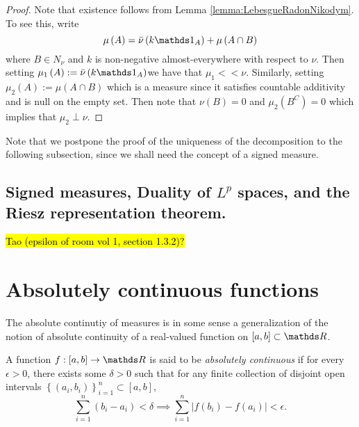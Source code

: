 \begin{proof}
Note that existence follows from Lemma \ref{lemma:LebesgueRadonNikodym}.
To see this, write 
\[
\mu\left(A\right)=\lebInt{\nu}{k\indicate_{A}}+\mu\left(A\cap B\right)
\]
where $B\in N_{\nu}$ and $k$ is non-negative almost-everywhere with
respect to $\nu.$ Then setting $\text{\ensuremath{\mu_{1}\left(A\right):=\lebInt{\nu}{k\indicate_{A}}}}$we
have that $\mu_{1}<<\nu$. Similarly, setting $\mu_{2}\left(A\right):=\mu\left(A\cap B\right)$
which is a measure since it satisfies countable additivity and is
null on the empty set. Then note that $\nu\left(B\right)=0$ and $\mu_{2}\left(B^{C}\right)=0$
which implies that $\mu_{2}\perp\nu$.
\end{proof}
Note that we postpone the proof of the uniqueness of the decomposition
to the following subsection, since we shall need the concept of a
signed measure.

\subsection{Signed measures, Duality of $L^{p}$ spaces, and the Riesz representation
theorem.}

\hl{Tao (epsilon of room vol 1, section 1.3.2)?}

\section{Absolutely continuous functions}

The absolute continutiy of measures is in some sense a generalization
of the notion of absolute continuity of a real-valued function on
$\left[a,b\right]\subset\R$.
\begin{defn}
\label{def:absolutelyContinuousFunction}A function $f:\left[a,b\right]\to\R$
is said to be \emph{absolutely continuous }if for every $\epsilon>0$,
there exists some $\delta>0$ such that for any finite collection
of disjoint open intervals $\left\{ \left(a_{i},b_{i}\right)\right\} _{i=1}^{n}\subset\left[a,b\right]$,
\[
\sum_{i=1}^{n}\left(b_{i}-a_{i}\right)<\delta\implies\sum_{i=1}^{n}\lvert f\left(b_{i}\right)-f\left(a_{i}\right)\rvert<\epsilon.
\]
\end{defn}

